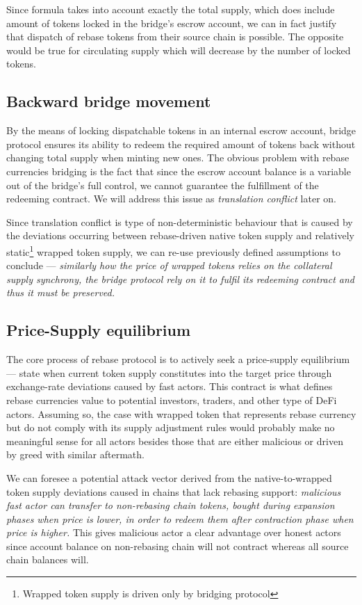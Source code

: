 \documentclass{article}
\begin{document}
Since formula takes into account exactly the total supply, which does include amount of tokens locked in the bridge's escrow account, we can in fact justify that dispatch of rebase tokens from their source chain is possible. The opposite would be true for circulating supply which will decrease by the number of locked tokens.

\subsection{Backward bridge movement}

By the means of locking dispatchable tokens in an internal escrow account, bridge protocol ensures its ability to redeem the required amount of tokens back without changing total supply when minting new ones. The obvious problem with rebase currencies bridging is the fact that since the escrow account balance is a variable out of the bridge's full control, we cannot guarantee the fulfillment of the redeeming contract. We will address this issue as \textit{translation conflict} later on.

Since translation conflict is type of non-deterministic behaviour that is caused by the deviations occurring between rebase-driven native token supply and relatively static\footnote{Wrapped token supply is driven only by bridging protocol} wrapped token supply, we can re-use previously defined assumptions to conclude --- \textit{similarly how the price of wrapped tokens relies on the collateral supply synchrony, the bridge protocol rely on it to fulfil its redeeming contract and thus it must be preserved.}

\subsection{Price-Supply equilibrium}

The core process of rebase protocol is to actively seek a price-supply equilibrium --- state when current token supply constitutes into the target price through exchange-rate deviations caused by fast actors. This contract is what defines rebase currencies value to potential investors, traders, and other type of DeFi actors. Assuming so, the case with wrapped token that represents rebase currency but do not comply with its supply adjustment rules would probably make no meaningful sense for all actors besides those that are either malicious or driven by greed with similar aftermath.

We can foresee a potential attack vector derived from the native-to-wrapped token supply deviations caused in chains that lack rebasing support: \textit{malicious fast actor can transfer to non-rebasing chain tokens, bought during expansion phases when price is lower, in order to redeem them after contraction phase when price is higher.} This gives malicious actor a clear advantage over honest actors since account balance on non-rebasing chain will not contract whereas all source chain balances will.
\end{document}
